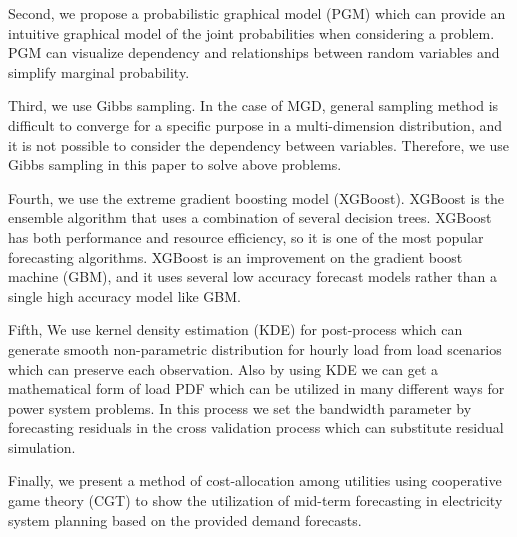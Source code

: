 \documentclass[journal]{IEEEtran} %
\begin{document}
Second, we propose a probabilistic graphical model (PGM) which can provide an intuitive graphical model of the joint probabilities when considering a problem. PGM can visualize dependency and relationships between random variables and simplify marginal probability.

Third, we use Gibbs sampling. In the case of MGD, general sampling method is difficult to converge for a specific purpose in a multi-dimension distribution, and it is not possible to consider the dependency between variables. Therefore, we use Gibbs sampling in this paper to solve above problems.

Fourth, we use the extreme gradient boosting model (XGBoost). XGBoost is the ensemble algorithm that uses a combination of several decision trees. XGBoost has both performance and resource efficiency, so it is one of the most popular forecasting algorithms. XGBoost is an improvement on the gradient boost machine (GBM), and it uses several low accuracy forecast models rather than a single high accuracy model like GBM.   

Fifth, We use kernel density estimation (KDE) for post-process which can generate smooth non-parametric distribution for hourly load from load scenarios which can preserve each observation. Also by using KDE we can get a mathematical form of load PDF which can be utilized in many different ways for power system problems. In this process we set the bandwidth parameter by forecasting residuals in the cross validation process which can substitute residual simulation.

Finally, we present a method of cost-allocation among utilities using cooperative game theory (CGT) to show the utilization of mid-term forecasting in electricity system planning based on the provided demand forecasts.
 
\end{document}
